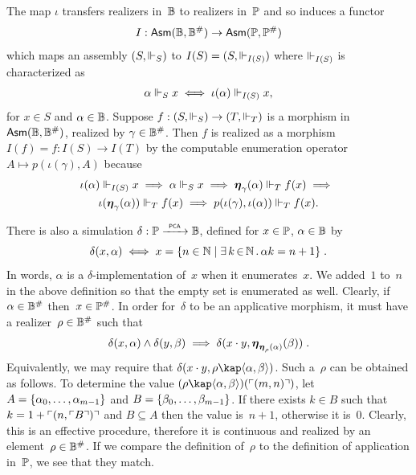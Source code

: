 The map $\iota$ transfers realizers in~$\mathbb{B}$ to realizers
in~$\mathbb{P}$ and so induces a functor
%
\begin{equation*}
  I : \mathsf{Asm}(\mathbb{B}, \mathbb{B}^{\#}) \to \mathsf{Asm}(\mathbb{P}, \mathbb{P}^{\#})
\end{equation*}
%
which maps an assembly $(S, {\Vdash_S})$ to $I(S) = (S, {\Vdash_{I(S)}})$
where $\Vdash_{I(S)}$ is characterized as
%
\begin{equation*}
  \alpha \Vdash_S x \iff
  \iota(\alpha) \Vdash_{I(S)} x,
\end{equation*}
%
for $x \in S$ and $\alpha \in \mathbb{B}$.
%
Suppose $f : (S, {\Vdash_S}) \to (T, {\Vdash_T})$ is a morphism in
$\mathsf{Asm}(\mathbb{B}, \mathbb{B}^{\#})$, realized by $\gamma \in \mathbb{B}^{\#}$.
Then $f$ is realized as a morphism $I(f) = f : I(S) \to I(T)$ by the
computable enumeration operator $A \mapsto p(\iota(\gamma), A)$
because
%
\begin{multline*}
  \iota(\alpha) \Vdash_{I(S)} x \implies
  \alpha \Vdash_S x \implies
  \text{\boldmath{$\eta$}}_{\gamma}(\alpha) \Vdash_T f(x) \implies {}\\
  \iota(\text{\boldmath{$\eta$}}_{\gamma}(\alpha)) \Vdash_T f(x) \implies
  p(\iota(\gamma), \iota(\alpha)) \Vdash_T f(x).
\end{multline*}
%



There is also a simulation $\delta: \mathbb{P} \xrightarrow{\scriptscriptstyle\mathsf{\ PCA\ }}{} \mathbb{B}$, defined for
$x \in \mathbb{P}$, $\alpha \in \mathbb{B}$ by
\begin{equation*}
  \delta(x, \alpha)
  \iff
  x = \{n \in \mathbb{N} \mid \exists\, k \,{\in}\, \mathbb{N}\,.\,\alpha k = n + 1\} \;.
\end{equation*}
In words, $\alpha$ is a $\delta$-implementation of~$x$ when it
enumerates~$x$. We added~$1$ to~$n$ in the above definition so that
the empty set is enumerated as well. Clearly, if $\alpha \in \mathbb{B}^{\#}$
then~$x \in \mathbb{P}^{\#}$. In order for~$\delta$ to be an applicative
morphism, it must have a realizer~$\rho \in \mathbb{B}^{\#}$ such that
\begin{equation*}
  \delta(x, \alpha) \land
  \delta(y, \beta)
  \implies
  \delta(x \cdot y, \text{\boldmath{$\eta$}}_{\text{\boldmath{$\eta$}}_{\rho}(\alpha)}(\beta)) \;.
\end{equation*}
Equivalently, we may require that $\delta(x \cdot y, \rho \kap
\pair{\alpha, \beta})$. Such a~$\rho$ can be obtained as follows.
To determine the value $(\rho \kap \pair{\alpha, \beta})
(\code{(m, n)})$, let $A = \{\alpha_0, \ldots, \alpha_{m-1}\}$
and $B = \{\beta_0, \ldots, \beta_{m-1}\}$. If there exists $k
\in B$ such that $k = 1 + \ulcorner (n, \ulcorner B \urcorner) \urcorner$ and $B \subseteq
A$ then the value is~$n+1$, otherwise it is~$0$. Clearly, this is an
effective procedure, therefore it is continuous and realized by an
element~$\rho \in \mathbb{B}^{\#}$. If we compare the definition of~$\rho$ to
the definition of application in~$\mathbb{P}$, we see that they match.

